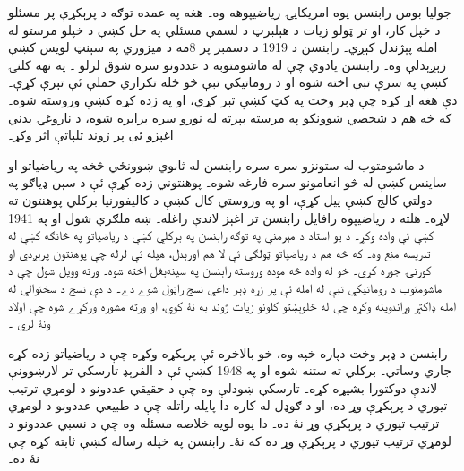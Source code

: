 \documentclass[../../../include/open-logic-section]{subfiles}
\begin{document}



جوليا بومن رابنسن يوه امريکايۍ رياضيپوهه
وه۔ هغه په عمده توګه د پرېکړې پر مسئلو
د خپل کار، او تر ټولو زيات د هېلبرټ
د لسمې مسئلې په حل کښې د خپلو مرستو
له امله پېژندل کېږي۔ رابنسن د 1919
د دسمبر پر 8مه د ميزوري په سېنټ
لويس کښې زېږېدلې وه۔ رابنسن يادوي
چې له ماشومتوبه د عددونو سره شوق
لرلو \citep[4]{Reid1986}۔ په نهه
کلنۍ کښې په سرې تبې اخته شوه او
د روماتيکي تبې څو ځله تکراري
حملې ئې تېرې کړې۔ دې هغه اړ کړه
چې ډېر وخت په کټ کښې تېر کړي،
او په زده کړه کښې وروسته شوه۔
که څه هم د شخصي ښوونکو په مرسته
بېرته له نورو سره برابره شوه،
د ناروغۍ بدني اغېزو ئې پر ژوند
تلپاتې اثر وکړ۔

د ماشومتوب له ستونزو سره سره رابنسن
له ثانوي ښوونځي څخه په رياضياتو او
ساينس کښې له څو انعامونو سره فارغه
شوه۔ پوهنتوني زده کړې ئې د سېن
ډياګو په دولتي کالج کښې پيل کړې،
او په وروستي کال کښې د کاليفورنيا
برکلي پوهنتون ته لاړه۔ هلته د
رياضيپوه رافايل رابنسن تر اغېز
لاندې راغله۔ ښه ملګري شول او په
1941 کښې ئې واده وکړ۔ د يو استاد
د مېرمنې په توګه رابنسن په برکلي
کښې د رياضياتو په څانګه کښې له
تدريسه منع وه۔ که څه هم د
رياضياتو ټولګي ئې لا هم اورېدل،
هيله ئې لرله چې پوهنتون پرېږدي
او کورنۍ جوړه کړي۔ خو له واده
څه موده وروسته رابنسن په سينه‌بغل
اخته شوه۔ ورته وويل شول چې د
ماشومتوب د روماتيکي تبې له امله
ئې پر زړه ډېر داغي نسج راټول
شوے دے۔ د دې نسج د سختوالي له
امله ډاکټر وړاندوينه وکړه چې
له څلوېښتو کلونو زيات ژوند به
نۀ کوي، او ورته مشوره ورکړے
شوه چې اولاد ونۀ لري
\citep[13]{Reid1986}۔

رابنسن د ډېر وخت دپاره خپه وه، خو
بالاخره ئې پرېکړه وکړه چې د
رياضياتو زده کړه جاري وساتي۔ برکلي
ته ستنه شوه او په 1948 کښې ئې
د الفرېډ تارسکي تر لارښوونې
لاندې دوکتورا بشپړه کړه۔ تارسکي
ښودلې وه چې د حقيقي عددونو د
لومړي ترتيب تيوري د پرېکړې وړ
ده، او د ګوډل له کاره دا پايله
راتله چې د طبيعي عددونو د
لومړي ترتيب تيوري د پرېکړې
وړ نۀ ده۔ دا يوه لويه خلاصه
مسئله وه چې د نسبي عددونو
د لومړي ترتيب تيوري د پرېکړې
وړ ده که نۀ۔ رابنسن په خپله
رساله \citeyearpar{Robinson1949}
کښې ثابته کړه چې نۀ ده۔
\end{document}
